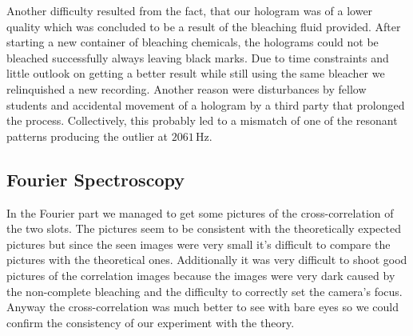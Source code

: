 Another difficulty resulted from the fact, that our hologram was of a lower quality which was concluded to be a result of the bleaching fluid provided. After starting a new container of bleaching chemicals, the holograms could not be bleached successfully always leaving black marks. Due to time constraints and little outlook on getting a better result while still using the same bleacher we relinquished a new recording. Another reason were disturbances by fellow students and accidental movement of a hologram by a third party that prolonged the process. Collectively, this probably led to a mismatch of one of the resonant patterns producing the outlier at $2061\,\mathrm{Hz}$.


\subsection{Fourier Spectroscopy}
In the Fourier part we managed to get some pictures of the cross-correlation of the two slots. The pictures seem to be consistent with the theoretically expected pictures but since the seen images were very small it's difficult to compare the pictures with the theoretical ones. Additionally it was very difficult to shoot good pictures of the correlation images because the images were very dark caused by the non-complete bleaching and the difficulty to correctly set the camera's focus. Anyway the cross-correlation was much better to see with bare eyes so we could confirm the consistency of our experiment with the theory.